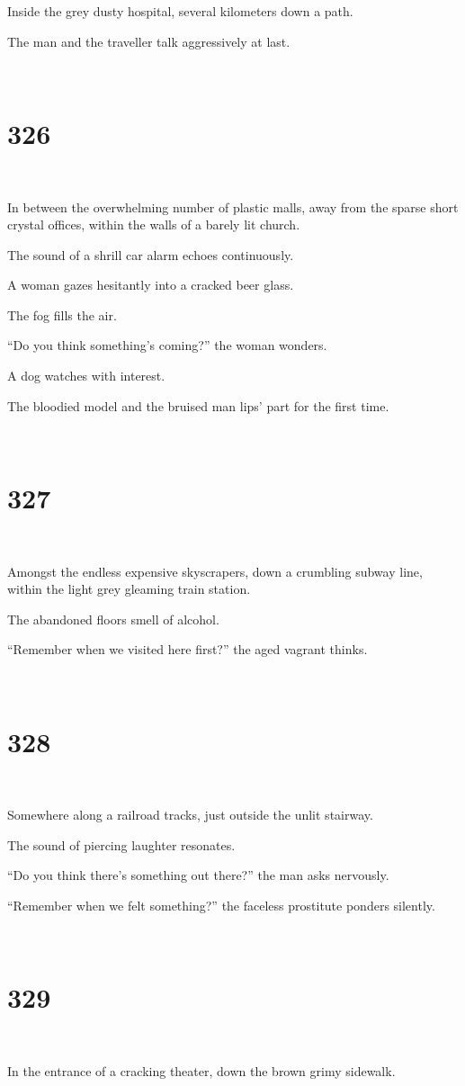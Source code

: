 \documentclass{report}
\begin{document}
Inside the grey dusty hospital, several kilometers down a path.

The man and the traveller talk aggressively at last.

~
\chapter*{326}
~

In between the overwhelming number of plastic malls, away from the sparse short crystal offices, within the walls of a barely lit church.

The sound of a shrill car alarm echoes continuously.

A woman gazes hesitantly into a cracked beer glass.

The fog fills the air.

``Do you think something's coming?'' the woman wonders.

A dog watches with interest.

The bloodied model and the bruised man lips' part for the first time.

~
\chapter*{327}
~

Amongst the endless expensive skyscrapers, down a crumbling subway line, within the light grey gleaming train station.

The abandoned floors smell of alcohol.

``Remember when we visited here first?'' the aged vagrant thinks.

~
\chapter*{328}
~

Somewhere along a railroad tracks, just outside the unlit stairway.

The sound of piercing laughter resonates.

``Do you think there's something out there?'' the man asks nervously.

``Remember when we felt something?'' the faceless prostitute ponders silently.

~
\chapter*{329}
~

In the entrance of a cracking theater, down the brown grimy sidewalk.
\end{document}
